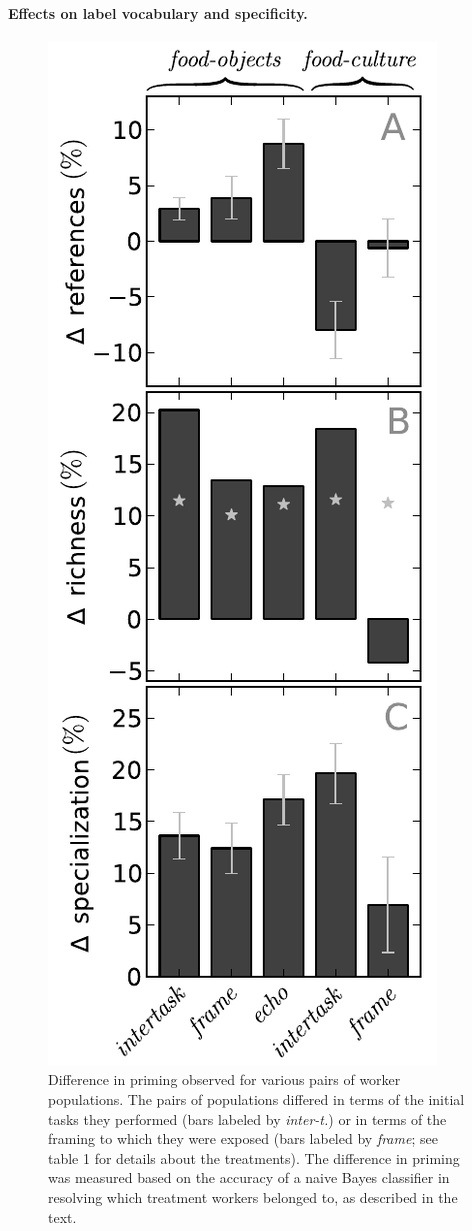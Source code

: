 \documentclass[12pt]{article}
\begin{document}
\paragraph{Effects on label vocabulary and specificity.}
\begin{figure}
	\centering
	\includegraphics[scale=1]{figs/vocab_specificity.pdf}
	\caption{
		Difference in priming observed for various pairs of worker populations.
		The pairs of populations differed in terms of the initial tasks they
		performed (bars labeled by \textit{inter-t.}) or in terms of the framing
		to which they were exposed (bars labeled by \textit{frame}; see table 1 for
		details about the treatments).  The difference in priming was 
		measured based on the accuracy of a naive Bayes classifier in 
		resolving which treatment workers belonged to, as described in the 
		text.  
	}
	\label{fig:specificity}
\end{figure}
\end{document}
